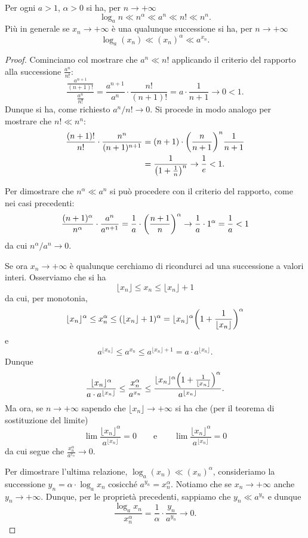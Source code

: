 \begin{theorem}
\mymark{***}
Per ogni $a>1$, $\alpha>0$ si ha, per $n\to +\infty$
\[
\log_a n \ll n^\alpha \ll a^n \ll n! \ll n^n.
\]
Più in generale se $x_n \to +\infty$
è una qualunque successione si ha,
per $n\to+\infty$
\[
\log_a(x_n) \ll (x_n)^\alpha \ll a^{x_n}.
\]
\end{theorem}
%
\begin{proof}
\mymark{**}
Cominciamo col mostrare che $a^n \ll n!$
applicando il criterio del rapporto alla successione $\frac{a^n}{n!}$:
\[
\frac{\displaystyle \frac{a^{n+1}}{(n+1)!}}{\displaystyle \frac{a^n}{n!}}
= \frac{a^{n+1}}{a^n}\cdot \frac{n!}{(n+1)!}
= a \cdot \frac {1}{n + 1} \to 0 < 1.
\]
Dunque si ha, come richiesto $a^n / n! \to 0$.
Si procede in modo analogo per mostrare che $n! \ll n^n$:
\begin{align*}
\frac{(n+1)!}{n!}\cdot \frac{n^n}{(n+1)^{n+1}}
&= (n+1) \cdot {\left( \frac{n}{n+1} \right)}^n \frac {1}{n+1}\\
&= \frac{1}{{\left( 1+\frac 1 n \right)}^n} \to \frac 1 e < 1.
\end{align*}

Per dimostrare che
$n^\alpha \ll a^n$
si può procedere con il criterio del rapporto, come nei casi precedenti:
\[
\frac{(n+1)^\alpha}{n^\alpha}\cdot \frac{a^n}{a^{n+1}}
= \frac 1 a \cdot {\left( \frac{n+1}{n} \right)}^\alpha \to \frac 1 a \cdot 1^\alpha = \frac 1 a < 1
\]
da cui $n^\alpha / a^n \to 0$.

Se ora $x_n\to +\infty$ è qualunque
cerchiamo di ricondurci ad una successione a valori interi.
Osserviamo che si ha
\[
\lfloor x_n \rfloor
\le x_n
\le \lfloor x_n \rfloor + 1
\]
da cui, per monotonia,
\[
\lfloor x_n \rfloor^\alpha
\le x_n^\alpha
\le (\lfloor x_n \rfloor + 1)^\alpha
= \lfloor x_n \rfloor^\alpha {\left( 1+ \frac{1}{\lfloor x_n \rfloor} \right)}^\alpha
\]
e
\[
a^{\lfloor x_n \rfloor}
\le a^{x_n}
\le a^{\lfloor x_n \rfloor + 1}
= a \cdot a^{\lfloor x_n \rfloor}.
\]
Dunque
\[
\frac{\lfloor x_n \rfloor^\alpha}{a \cdot a^{\lfloor x_n \rfloor}}
\le \frac{x_n^\alpha}{a^{x_n}}
\le \frac{\lfloor x_n \rfloor^\alpha {\left( 1+ \frac{1}{\lfloor x_n \rfloor} \right)}^\alpha}
    {a^{\lfloor x_n \rfloor}}.
\]
Ma ora, se $n\to +\infty$ sapendo che $\lfloor x_n\rfloor \to +\infty$ si ha
che (per il teorema di sostituzione del limite)
\[
\lim \frac{\lfloor x_n \rfloor^\alpha}{a^{\lfloor x_n \rfloor}} = 0
\qquad
\text{e}
\qquad
\lim \frac{\lfloor x_n \rfloor^\alpha }
    {a^{\lfloor x_n \rfloor}} = 0
\]
da cui segue che $\frac{x_n^\alpha}{a^{x_n}}\to 0$.

Per dimostrare l'ultima relazione, $\log_a(x_n)\ll (x_n)^\alpha$,
consideriamo la successione $y_n = \alpha \cdot \log_a x_n$
cosicché $a^{y_n} = x_n^\alpha$.
Notiamo che se $x_n\to +\infty$
anche $y_n \to +\infty$.
Dunque, per le proprietà precedenti,
sappiamo che $y_n \ll a^{y_n}$ e dunque
\[
\frac{\log_a x_n}{x_n^\alpha}
= \frac{1}{\alpha}\cdot\frac{y_n}{a^{y_n}} \to 0.
\]
\end{proof}

